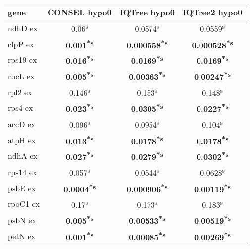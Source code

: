 \documentclass[a4paper]{article}
\begin{document}
\footnotesize
{}
\begin{longtable}{l|c|c|c}
﻿gene&CONSEL hypo0&IQTree hypo0&IQTree2 hypo0\\
\hline
\endhead
ndhD ex&0.06\textsuperscript{s}&0.0574\textsuperscript{s}&0.0559\textsuperscript{s}\\
clpP ex&\textbf{0.001\textsuperscript{*}\textsuperscript{s}}&\textbf{0.000558\textsuperscript{*}\textsuperscript{s}}&\textbf{0.000528\textsuperscript{*}\textsuperscript{s}}\\
rps19 ex&\textbf{0.016\textsuperscript{*}\textsuperscript{s}}&\textbf{0.0169\textsuperscript{*}\textsuperscript{s}}&\textbf{0.0169\textsuperscript{*}\textsuperscript{s}}\\
rbcL ex&\textbf{0.005\textsuperscript{*}\textsuperscript{s}}&\textbf{0.00363\textsuperscript{*}\textsuperscript{s}}&\textbf{0.00247\textsuperscript{*}\textsuperscript{s}}\\
rpl2 ex&0.146\textsuperscript{s}&0.153\textsuperscript{s}&0.148\textsuperscript{s}\\
rps4 ex&\textbf{0.023\textsuperscript{*}\textsuperscript{s}}&\textbf{0.0305\textsuperscript{*}\textsuperscript{s}}&\textbf{0.0227\textsuperscript{*}\textsuperscript{s}}\\
accD ex&0.096\textsuperscript{s}&0.0954\textsuperscript{s}&0.104\textsuperscript{s}\\
atpH ex&\textbf{0.013\textsuperscript{*}\textsuperscript{s}}&\textbf{0.0178\textsuperscript{*}\textsuperscript{s}}&\textbf{0.0178\textsuperscript{*}\textsuperscript{s}}\\
ndhA ex&\textbf{0.027\textsuperscript{*}\textsuperscript{s}}&\textbf{0.0279\textsuperscript{*}\textsuperscript{s}}&\textbf{0.0302\textsuperscript{*}\textsuperscript{s}}\\
rps14 ex&0.057\textsuperscript{s}&0.0544\textsuperscript{s}&0.0628\textsuperscript{s}\\
psbE ex&\textbf{0.0004\textsuperscript{*}\textsuperscript{s}}&\textbf{0.000906\textsuperscript{*}\textsuperscript{s}}&\textbf{0.00119\textsuperscript{*}\textsuperscript{s}}\\
rpoC1 ex&0.17\textsuperscript{s}&0.173\textsuperscript{s}&0.183\textsuperscript{s}\\
psbN ex&\textbf{0.005\textsuperscript{*}\textsuperscript{s}}&\textbf{0.00533\textsuperscript{*}\textsuperscript{s}}&\textbf{0.00519\textsuperscript{*}\textsuperscript{s}}\\
petN ex&\textbf{0.001\textsuperscript{*}\textsuperscript{s}}&\textbf{0.00085\textsuperscript{*}\textsuperscript{s}}&\textbf{0.00269\textsuperscript{*}\textsuperscript{s}}\\

\end{longtable}
\end{document}
